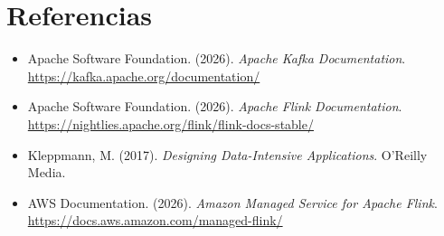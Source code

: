 \documentclass[11pt,a4paper]{article}
\begin{document}
\section{Referencias}

\begin{itemize}[nosep]
\item Apache Software Foundation. (2026). \emph{Apache Kafka Documentation}. \url{https://kafka.apache.org/documentation/}
\item Apache Software Foundation. (2026). \emph{Apache Flink Documentation}. \url{https://nightlies.apache.org/flink/flink-docs-stable/}
\item Kleppmann, M. (2017). \emph{Designing Data-Intensive Applications}. O'Reilly Media.
\item AWS Documentation. (2026). \emph{Amazon Managed Service for Apache Flink}. \url{https://docs.aws.amazon.com/managed-flink/}
\end{itemize}
\end{document}
